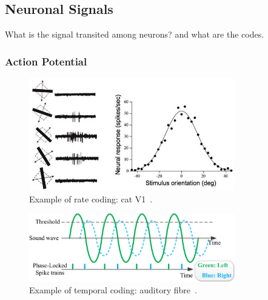 

\subsection{Neuronal Signals}

What is the signal transited among neurons?
and what are the codes.

\subsubsection{Action Potential}
\begin{figure}[bt]
	\centering
	\includegraphics[width=0.8\textwidth]{pics_snn/v1.jpg}
	\caption{Example of rate coding: cat V1~\cite{hubel1962receptive}.}
	\label{Fig:v1}
\end{figure}

\begin{figure}[bt]
	\centering
	\includegraphics[width=0.8\textwidth]{pics_snn/phaselocking.png}
	\caption{Example of temporal coding: auditory fibre~\cite{liu2013modeling}.}
	\label{Fig:audio_fibre}
\end{figure}

